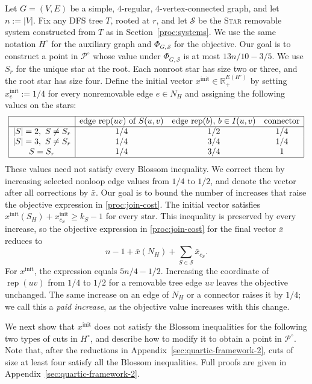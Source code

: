 \documentclass[11pt]{amsart}
\DeclareMathOperator{\R}{\mathbb{R}}
\newcommand{\rep}[1]{\operatorname{rep}(#1)}
\def\R{{\mathbb R}}
\newcommand{\1}{\mathbbm{1}}
\begin{document}
{Let $G=(V,E)$ be a simple, $4$-regular, $4$-vertex-connected
graph, and let $n:=|V|$. Fix any DFS tree $T$, rooted at $r$, and let
$\mathcal S$ be the \textsc{Star} removable system constructed
from $T$ as in Section~\ref{proc:systems}.
We use the same notation $H^\circ$ for the auxiliary graph
and $\Phi_{G,\mathcal S}$ for the objective.
Our goal is to construct a point in ${\mathcal P^\circ}$
whose value under $\Phi_{G,\mathcal S}$ is at most
$13n/10-3/5$. We use $S_r$ for the unique star at the root.} Each nonroot star has size two or three, and the root star
has size four. Define the initial vector $x^{\mathrm{init}}\in \R_+^{E(H^\circ)}$ by setting $x^{\mathrm{init}}_e:=1/4$ for every nonremovable edge $e\in N_H$ and
assigning the following values on the stars:
\[
\begin{array}{|c|ccc|}
\hline 
 &\text{edge $\rep{uv}$ of $S(u,v)$}&\text{edge $\rep{b}$, $b\in I(u,v)$}
 &\text{connector}\\ \hline
 |S|=2,\ S\ne S_r&1/4&1/2&1/4\\
 |S|=3,\ S\ne S_r&1/4&3/4&1/4\\
 S=S_r&1/4&3/4&1\\
 \hline
\end{array}
\]
These values need not satisfy every Blossom inequality. We correct
them by increasing selected nonloop edge values from $1/4$ to $1/2$,
and denote the vector after all corrections by $\bar x$.
Our goal is to bound the number of increases that raise the
objective expression in \eqref{proc:join-cost}. The initial vector satisfies
$x^{\mathrm{init}}(S_H)+x^{\mathrm{init}}_{c_S}\ge k_S-1$ for
every star. This inequality is preserved by every increase,
so the objective expression in \eqref{proc:join-cost} for the
final vector $\bar x$ reduces to
\[
 n-1+\bar x(N_H)+\sum_{S\in\mathcal S}\bar x_{c_S}.
\]
For
$x^{\mathrm{init}}$, the expression equals $5n/4-1/2$.
Increasing the coordinate of $\rep{uv}$ from $1/4$ to $1/2$
for a removable tree edge $uv$ leaves the objective unchanged.
The same increase on an edge of $N_H$ or a connector raises it
by $1/4$; we call this a \textit{paid increase}, as the objective value increases with this change.

{ We next show that $x^{\mathrm{init}}$ does
not satisfy the Blossom inequalities for the following two
types of cuts in $H^\circ$, and describe how to modify it
to obtain a point in $\mathcal P^\circ$. Note that, after the reductions in
Appendix~\ref{sec:quartic-framework-2}, cuts of size at least
four satisfy all the Blossom inequalities. Full proofs are
given in Appendix~\ref{sec:quartic-framework-2}.}
\end{document}
